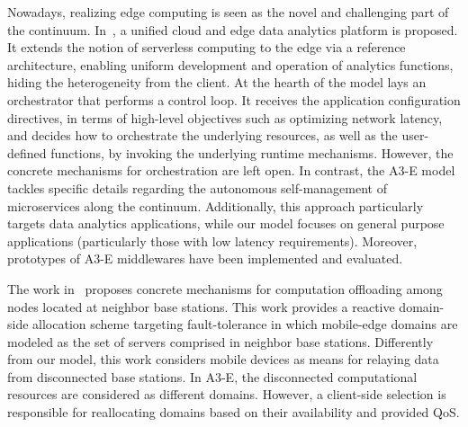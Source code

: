 Nowadays, realizing edge computing is seen as the novel and challenging part of the continuum. In~\cite{Nastic17ServerlessDataAnalytics}, a unified cloud and edge data analytics platform is proposed. It extends the notion of serverless computing to the edge via a reference architecture, enabling uniform development and operation of analytics functions, hiding the heterogeneity from the client. At the hearth of the model lays an orchestrator that performs a control loop. It receives the application configuration directives, in terms of high-level objectives such as optimizing network latency, and decides how to orchestrate the underlying resources, as well as the user-defined functions, by invoking
the underlying runtime mechanisms. However, the concrete mechanisms for orchestration are left open. In contrast, the A3-E model tackles specific details regarding the autonomous self-management of  microservices along the continuum. Additionally, this approach particularly targets data analytics applications, while our model focuses on general purpose applications (particularly those with low latency requirements). Moreover, prototypes of A3-E middlewares have been implemented and evaluated. 



The work in~\cite{Satria2017mec} proposes concrete mechanisms for computation offloading among nodes located at neighbor base stations. This work provides a reactive domain-side allocation scheme targeting fault-tolerance in which mobile-edge domains are modeled as the set of servers comprised in neighbor base stations. Differently from our model, this work considers mobile devices as means for relaying data from disconnected base stations. In A3-E, the disconnected computational resources are considered as different domains. However, a client-side selection is responsible for reallocating domains based on their availability and provided QoS. 

